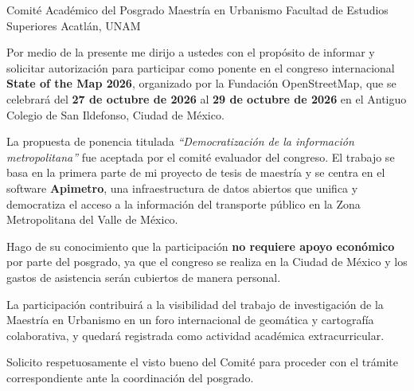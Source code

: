 
\DatosDestinatario
  {Comité Académico del Posgrado}
  {Maestría en Urbanismo}
  {Facultad de Estudios Superiores Acatlán, UNAM}



Por medio de la presente me dirijo a ustedes con el propósito de informar y
solicitar autorización para participar como ponente en el congreso internacional
\textbf{State of the Map 2026}, organizado por la Fundación OpenStreetMap, que
se celebrará del \textbf{27 de octubre de 2026} al \textbf{29 de octubre de 2026} en 
el Antiguo Colegio de San Ildefonso, Ciudad de México.


La propuesta de ponencia titulada \textit{``Democratización de la información
metropolitana''} fue aceptada por el comité evaluador del congreso.  El trabajo
se basa en la primera parte de mi proyecto de tesis de maestría y se centra en
el software \textbf{Apimetro}, una infraestructura de datos abiertos que unifica
y democratiza el acceso a la información del transporte público en la Zona
Metropolitana del Valle de México.


Hago de su conocimiento que la participación \textbf{no requiere apoyo
económico} por parte del posgrado, ya que el congreso se realiza en la Ciudad
de México y los gastos de asistencia serán cubiertos de manera personal.

La participación contribuirá a la visibilidad del trabajo de investigación de
la Maestría en Urbanismo en un foro internacional de geomática y cartografía
colaborativa, y quedará registrada como actividad académica extracurricular.

Solicito respetuosamente el visto bueno del Comité para proceder con el trámite
correspondiente ante la coordinación del posgrado.

\vspace{0.8cm}

